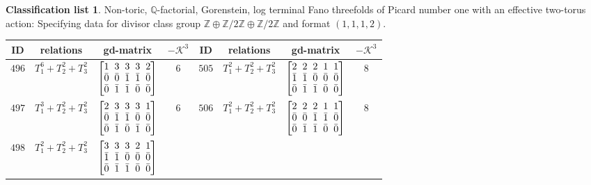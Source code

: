 \documentclass[10pt,a4paper]{amsart}
\theoremstyle{definition}
\newtheorem{class-list}[thm]{Classification list}
\def\ZZ{{\mathbb Z}}
\def\QQ{{\mathbb Q}}
\numberwithin{equation}{section}
\begin{document}
\begin{class-list}
Non-toric, $\QQ$-factorial, Gorenstein, log terminal Fano
threefolds of Picard number one with an effective two-torus action:
Specifying data for divisor class group $
\ZZ\oplus \ZZ/2\ZZ\oplus \ZZ/2\ZZ$ and format $(1,1,1,2)$.
\begin{table}[h!]\centering\setlength{\tabcolsep}{3.5pt}
\renewcommand{\arraystretch}{1.15}\small\tabulinesep=1mm
\begin{tabu}{c|c|c|c||c|c|c|c}
\hline
ID&relations&gd-matrix&$-\mathcal{K}^3$&ID&relations&gd-matrix&$-\mathcal{K}^3$
\\
\hline
${496}$&${T_{1}^{6}+T_{2}^{2}+T_{3}^{2}}$
&$\arraycolsep=1mm\begin{bmatrix}{1} & {3} & {3} & {3} & {2} \\ {\bar{0}} & {\bar{0}} & {\bar{1}} & {\bar{1}} & {\bar{0}} \\ {\bar{0}} & {\bar{1}} & {\bar{1}} & {\bar{0}} & {\bar{0}}\end{bmatrix}$
&${6}$
&${505}$&${T_{1}^{2}+T_{2}^{2}+T_{3}^{2}}$
&$\arraycolsep=1mm\begin{bmatrix}{2} & {2} & {2} & {1} & {1} \\ {\bar{1}} & {\bar{1}} & {\bar{0}} & {\bar{0}} & {\bar{0}} \\ {\bar{0}} & {\bar{1}} & {\bar{1}} & {\bar{0}} & {\bar{0}}\end{bmatrix}$
&${8}$
\\
\hline
${497}$&${T_{1}^{3}+T_{2}^{2}+T_{3}^{2}}$
&$\arraycolsep=1mm\begin{bmatrix}{2} & {3} & {3} & {3} & {1} \\ {\bar{0}} & {\bar{1}} & {\bar{1}} & {\bar{0}} & {\bar{0}} \\ {\bar{0}} & {\bar{1}} & {\bar{0}} & {\bar{1}} & {\bar{0}}\end{bmatrix}$
&${6}$
&${506}$&${T_{1}^{2}+T_{2}^{2}+T_{3}^{2}}$
&$\arraycolsep=1mm\begin{bmatrix}{2} & {2} & {2} & {1} & {1} \\ {\bar{0}} & {\bar{0}} & {\bar{1}} & {\bar{1}} & {\bar{0}} \\ {\bar{0}} & {\bar{1}} & {\bar{1}} & {\bar{0}} & {\bar{0}}\end{bmatrix}$
&${8}$
\\
\hline
${498}$&${T_{1}^{2}+T_{2}^{2}+T_{3}^{2}}$
&$\arraycolsep=1mm\begin{bmatrix}{3} & {3} & {3} & {2} & {1} \\ {\bar{1}} & {\bar{1}} & {\bar{0}} & {\bar{0}} & {\bar{0}} \\ {\bar{0}} & {\bar{1}} & {\bar{1}} & {\bar{0}} & {\bar{0}}\end{bmatrix}$

\end{tabu}
\end{table}
\end{class-list}
\end{document}
